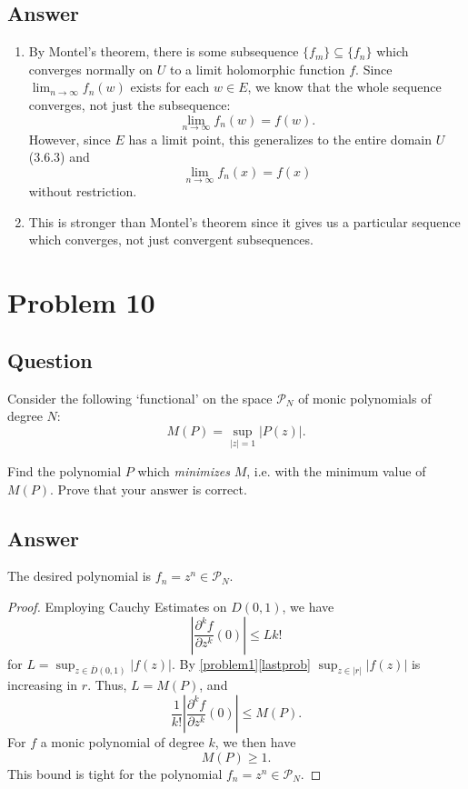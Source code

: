 \documentclass[11pt]{article}
\begin{document}
\subsection{Answer}
\begin{enumerate}
\item By Montel's theorem, there is some subsequence $\{f_m\} \subseteq \{f_n\}$ which converges normally on $U$ to a limit holomorphic function $f$. Since $\lim_{n \to \infty} f_n(w)$ exists for each $w \in E$, we know that the whole sequence converges, not just the subsequence:
\[\lim_{n \to \infty} f_n(w) = f(w).\]
However, since $E$ has a limit point, this generalizes to the entire domain $U$ (3.6.3) and 
\[ \lim_{n \to \infty} f_n(x) = f(x)\]
without restriction.
\item This is stronger than Montel's theorem since it gives us a particular sequence which converges, not just convergent subsequences.

\end{enumerate}


\section{Problem 10}
\subsection{Question}
Consider the following `functional' on the space $\mathcal{P}_N$ of monic polynomials of degree $N$:
\[M(P) = \sup_{|z| = 1} |P(z)|.\]

Find the polynomial $P$ which \emph{minimizes} $M$, i.e. with the minimum value of $M(P)$. Prove that your answer is correct.
\subsection{Answer}
The desired polynomial is $f_n = z^n \in \mathcal{P}_N$.
\begin{proof}
Employing Cauchy Estimates on $D(0,1)$, we have 
\[\left| \frac{\partial^k f}{\partial z^k} (0) \right| \leq L k !\]
for $L = \sup_{z \in \overline{D}(0,1)} |f(z)|$. By \ref{problem1}\ref{lastprob} $\sup_{z \in |r|}|f(z)|$ is increasing in $r$. Thus, $L = M(P)$, and
\[ \frac{1}{k!} \left| \frac{\partial^k f}{\partial z^k} (0) \right| \leq M(P) .\]
For $f$ a monic polynomial of degree $k$, we then have
\[M(P) \geq 1.\]
This bound is tight for the polynomial $f_n = z^n \in \mathcal{P}_N$.\end{proof}
\end{document}
